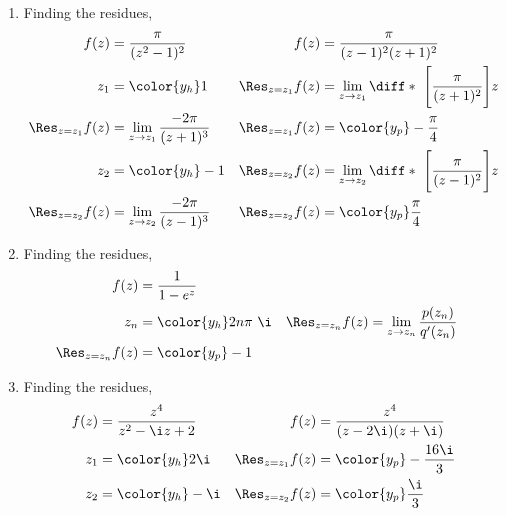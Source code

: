\begin{enumerate}
    \item Finding the residues,
          \begin{align}
              f(z)                & = \frac{\pi}{(z^2 - 1)^2}                  &
              f(z)                & = \frac{\pi}{(z-1)^2(z + 1)^2}               \\
              z_1                 & = \color{y_h} 1                            &
              \Res_{z = z_1} f(z) & = \lim_{z \to z_1} \diff* {\ \Bigg[
              \frac{\pi}{(z+1)^2}\Bigg]}{z}                                      \\
              \Res_{z = z_1} f(z) & = \lim_{z \to z_1} \frac{-2\pi}{(z + 1)^3} &
              \Res_{z = z_1} f(z) & = \color{y_p} -\frac{\pi}{4}                 \\
              z_2                 & = \color{y_h} -1                           &
              \Res_{z = z_2} f(z) & = \lim_{z \to z_2} \diff* {\ \Bigg[
              \frac{\pi}{(z-1)^2}\Bigg]}{z}                                      \\
              \Res_{z = z_2} f(z) & = \lim_{z \to z_2} \frac{-2\pi}{(z - 1)^3} &
              \Res_{z = z_2} f(z) & = \color{y_p} \frac{\pi}{4}
          \end{align}

    \item Finding the residues,
          \begin{align}
              f(z)                & = \frac{1}{1 - e^z}                         \\
              z_n                 & = \color{y_h} 2n\pi\ \i                   &
              \Res_{z = z_n} f(z) & = \lim_{z \to z_n} \frac{p(z_n)}{q'(z_n)}   \\
              \Res_{z = z_n} f(z) & = \color{y_p} -1
          \end{align}

    \item Finding the residues,
          \begin{align}
              f(z)                & = \frac{z^4}{z^2 - \i z + 2}    &
              f(z)                & = \frac{z^4}{(z - 2\i)(z + \i)}   \\
              z_1                 & = \color{y_h} 2\i               &
              \Res_{z = z_1} f(z) & = \color{y_p} -\frac{16\i}{3}     \\
              z_2                 & = \color{y_h} -\i               &
              \Res_{z = z_2} f(z) & = \color{y_p} \frac{\i}{3}
          \end{align}


\end{enumerate}
